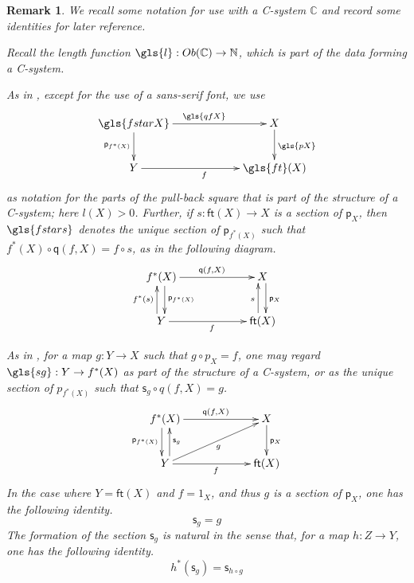 \documentclass[12pt]{article}
\numberwithin{equation}{section}
\newenvironment{eq}{\begin{equation}}{\end{equation}}
\newtheorem{remark}[proposition]{Remark}
\newcommand{\sr}{\rightarrow}
\newcommand{\NN}{{\mathbb N}}
\newcommand{\CC}{{\mathbb C}}  %
\newcommand{\ft}{\mathsf{ft}}
\newcommand{\p}{\mathsf{p}}
\newcommand{\q}{\mathsf{q}}
\newcommand{\s}{\mathsf{s}}     %
\newcommand{\Ob}{Ob}
\begin{document}
\begin{remark}
  We recall some notation for use with a C-system $\CC$ and record some identities for later reference.

  Recall the length function $\gls{l} : \Ob(\CC) \to \NN$, which is part of the data forming a C-system.


  As in \cite[Def.~2.1 and Prop.~2.4]{Csubsystems}, except for the use of a sans-serif font, we use
  \begin{eq}
    \xymatrix@C=5pc{
      \gls{fstarX} \ar[r]^{\gls{qfX}} \ar[d]_{\p_{f^*(X)}}  & X \ar[d]^{\gls{pX}} \\
      Y \ar[r]_f & \gls{ft}(X)
    }
  \end{eq}%
  as notation for the parts of the pull-back square that is part of the
  structure of a C-system; here $l(X) > 0$.
  Further, if $s : \ft(X) \sr X$ is a section of $\p_X$, then $\gls{fstars}$ denotes
  the unique section of $\p_{f^*(X)}$ such that $f^*(X) \circ \q(f,X) = f \circ
  s$, as in the following diagram.
  \begin{eq}
    \xymatrix@C=5pc{
      f^*(X) \ar[r]^{\q(f,X)} \ar@<3pt>[d]^{\p_{f^*(X)}}  & X \ar@<3pt>[d]^{\p_X} \\
      Y \ar[r]_f \ar@<4pt>[u]^{f^*(s)} & \ft(X) \ar@<4pt>[u]^s
    }
  \end{eq}%

  As in \cite[Def.~2.3 and Prop.~2.4]{Csubsystems}, for a map $g : Y \sr X$
  such that $g \circ p_X = f$, one may regard
  $\gls{sg} : Y \sr f^*(X)$ as part of the structure of a C-system, or
  as the unique section of $p_{f^*(X)}$ such that $\s_g \circ q(f,X) = g$.
  \begin{eq}
    \xymatrix@C=5pc{
      f^*(X) \ar[r]^{\q(f,X)} \ar@<-3pt>[d]_{\p_{f^*(X)}} & X \ar[d]^{\p_X} \\
      Y \ar[ru]_g \ar[r]_f \ar@<-4pt>[u]_{\s_g} & \ft(X)
    }
  \end{eq}%
  In the case where $Y = \ft(X)$ and $f = 1_X$, and thus $g$ is a section of $\p_X$,
  one has the following identity.
  \begin{eq}
    \label{section-section}
    \s_g = g
  \end{eq}%
  The formation of the section $\s_g$ is natural in the sense that, for a map
  $h : Z \to Y$, one has the following identity.
  \begin{eq}
    \label{s-naturality}
    h^* (\s_g) = \s_{h \circ g}
  \end{eq}%


\end{remark}
\end{document}
